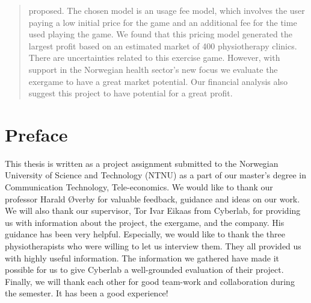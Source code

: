 \documentclass[b5paper,twoside,openright,11pt]{report}
\begin{document}
\begin{abstract}
proposed. The chosen model is an usage fee model, which involves the user paying a low initial price for the game and an additional fee for the time used playing the game. We found that this pricing model generated the largest profit based on an estimated market of 400 physiotherapy clinics. There are uncertainties related to this exercise game. However, with support in the Norwegian health sector's new focus we evaluate the exergame to have a great market potential. Our financial analysis also suggest this project to have potential for a great profit.
\end{abstract}
\cleardoublepage
\chapter*{Preface}
This thesis is written as a project assignment submitted to the Norwegian University of Science and Technology (NTNU) as a part of our master's degree in Communication Technology, Tele-economics. 
We would like to thank our professor Harald Øverby for valuable feedback, guidance and ideas on our work. We will also thank our supervisor, Tor Ivar Eikaas from Cyberlab, for providing us with information about the project, the exergame, and the company. His guidance has been very helpful. Especially, we would like to thank the three physiotherapists who were willing to let us interview them. They all provided us with highly useful information. The information we gathered have made it possible for us to give Cyberlab a well-grounded evaluation of their project.  
Finally, we will thank each other for good team-work and collaboration during the semester. It has been a good experience! 

\cleardoublepage
{}
\tableofcontents
\cleardoublepage

\cleardoublepage
\listoffigures
\cleardoublepage
\listoftables
\cleardoublepage
{}
\pagestyle{fancy}
\fancyhead[LE]{\thepage}
\fancyhead[RE]{\leftmark}
\fancyhead[RO]{\thepage}
\fancyhead[LO]{\rightmark}
\fancyfoot{}

\cleardoublepage

\cleardoublepage

\cleardoublepage

\cleardoublepage

\cleardoublepage

\cleardoublepage

\cleardoublepage

\cleardoublepage

\cleardoublepage

\cleardoublepage


\pagestyle{plain}
\cleardoublepage
\appendix 
 
\cleardoublepage
\end{document}
